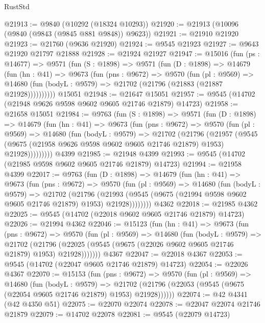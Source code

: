 \begin{lexlean}{RustStd}
\begin{coremodule}
@21913 := @9840 (@10292 (@18324 @10293))
@21920 := @21913 (@10096 (@9840 (@9843 (@9845 @881 @9848)) @9623))
@21921 := @21910 @21920
@21923 := @21760 (@9636 @21920)
@21924 := @9545 @21923
@21927 := @9643 @21920 @21797 @21888
@21928 := @21924 @21927
@21947 := @15016
    (fun (ps : @14677) =>
    @9571
      (fun (S : @1898) =>
      @9571
        (fun (D : @1898) =>
        @14679
          (fun (hn : @41) =>
          @9673
            (fun (pns : @9672) =>
            @9570
              (fun (pl : @9569) =>
              @14680 (fun (bodyL : @9579) => @21702 (@21796 (@21883 (@21887 @21928))))))))))
    @15051
@21948 := @21647 @15051
@21957 := @9545 (@14702 (@21948 @9626 @9598 @9602 @9605 @21746 @21879) @14723)
@21958 := @21658 @15051
@21984 := @9763
    (fun (S : @1898) =>
    @9571
      (fun (D : @1898) =>
      @14679
        (fun (hn : @41) =>
        @9673
          (fun (pns : @9672) =>
          @9570
            (fun (pl : @9569) =>
            @14680
              (fun (bodyL : @9579) =>
              @21702
                (@21796
                  (@21957
                    (@9545
                      (@9675 (@21958 @9626 @9598 @9602 @9605 @21746 @21879) @1953)
                      @21928)))))))))
    @4399
@21985 := @21948 @4399
@21993 := @9545 (@14702 (@21985 @9598 @9602 @9605 @21746 @21879) @14723)
@21994 := @21958 @4399
@22017 := @9763
    (fun (D : @1898) =>
    @14679
      (fun (hn : @41) =>
      @9673
        (fun (pns : @9672) =>
        @9570
          (fun (pl : @9569) =>
          @14680
            (fun (bodyL : @9579) =>
            @21702
              (@21796
                (@21993 (@9545 (@9675 (@21994 @9598 @9602 @9605 @21746 @21879) @1953) @21928))))))))
    @4362
@22018 := @21985 @4362
@22025 := @9545 (@14702 (@22018 @9602 @9605 @21746 @21879) @14723)
@22026 := @21994 @4362
@22046 := @15123
    (fun (hn : @41) =>
    @9673
      (fun (pns : @9672) =>
      @9570
        (fun (pl : @9569) =>
        @14680
          (fun (bodyL : @9579) =>
          @21702
            (@21796 (@22025 (@9545 (@9675 (@22026 @9602 @9605 @21746 @21879) @1953) @21928)))))))
    @4367
@22047 := @22018 @4367
@22053 := @9545 (@14702 (@22047 @9605 @21746 @21879) @14723)
@22054 := @22026 @4367
@22070 := @15153
    (fun (pns : @9672) =>
    @9570
      (fun (pl : @9569) =>
      @14680
        (fun (bodyL : @9579) =>
        @21702 (@21796 (@22053 (@9545 (@9675 (@22054 @9605 @21746 @21879) @1953) @21928))))))
@22074 := @42 @4341 (@42 @4350 @51)
@22075 := @22070 @22074
@22078 := @22047 @22074 @21746 @21879
@22079 := @14702 @22078
@22081 := @9545 (@22079 @14723)

\end{coremodule}
\end{lexlean}
